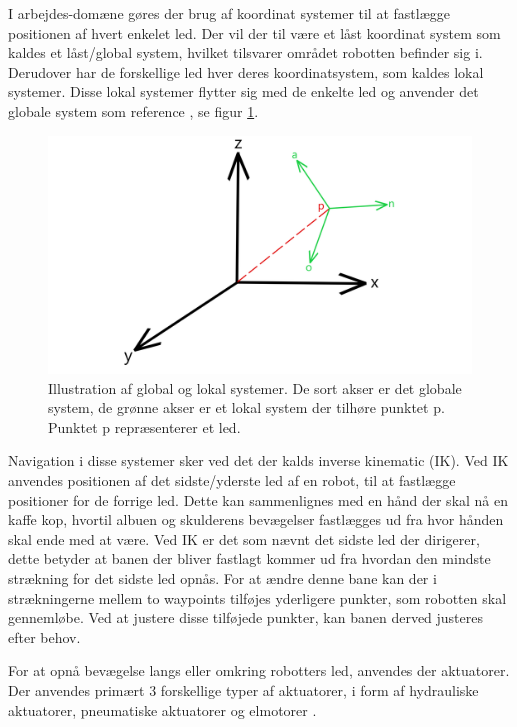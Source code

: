 I arbejdes-domæne gøres der brug af koordinat systemer til at fastlægge positionen af hvert enkelet led. Der vil der til være et låst koordinat system som kaldes et låst/global system, hvilket tilsvarer området robotten befinder sig i. Derudover har de forskellige led hver deres koordinatsystem, som kaldes lokal systemer. Disse lokal systemer flytter sig med de enkelte led og anvender det globale system som reference \parencite{Castro2019TrajectoryManipulators}, se figur \ref{fig:Global og lokal systemer}.

\begin{figure} [H]
    \centering
    \includegraphics[width=0.7\linewidth]{Sections/2 Problemanalyse/Media/Global og local frames.png}
    \caption{Illustration af global og lokal systemer. De sort akser er det globale system, de grønne akser er et lokal system der tilhøre punktet p. Punktet p repræsenterer et led.}
    \label{fig:Global og lokal systemer}
\end{figure}

Navigation i disse systemer sker ved det der kalds inverse kinematic (IK).
Ved IK anvendes positionen af det sidste/yderste led af en robot, til at fastlægge positioner for de forrige led. Dette kan sammenlignes med en hånd der skal nå en kaffe kop, hvortil albuen og skulderens bevægelser fastlægges ud fra hvor hånden skal ende med at være. Ved IK er det som nævnt det sidste led der dirigerer, dette betyder at banen der bliver fastlagt kommer ud fra hvordan den mindste strækning for det sidste led opnås. For at ændre denne bane kan der i strækningerne mellem to waypoints tilføjes yderligere punkter, som robotten skal gennemløbe. Ved at justere disse tilføjede punkter, kan banen derved justeres efter behov.

For at opnå bevægelse langs eller omkring robotters led, anvendes der aktuatorer. Der anvendes primært 3 forskellige typer af aktuatorer, i form af hydrauliske aktuatorer, pneumatiske aktuatorer og elmotorer \parencite{Niku2020IntroductionApplications}.


